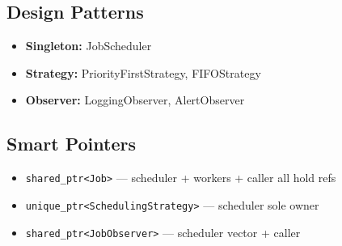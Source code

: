 \documentclass[11pt,a4paper]{article}
\begin{document}
\subsection{Design Patterns}
\begin{itemize}
    \item \textbf{Singleton:} JobScheduler
    \item \textbf{Strategy:} PriorityFirstStrategy, FIFOStrategy
    \item \textbf{Observer:} LoggingObserver, AlertObserver
\end{itemize}

\subsection{Smart Pointers}
\begin{itemize}
    \item \texttt{shared\_ptr<Job>} --- scheduler + workers + caller all hold refs
    \item \texttt{unique\_ptr<SchedulingStrategy>} --- scheduler sole owner
    \item \texttt{shared\_ptr<JobObserver>} --- scheduler vector + caller
\end{itemize}

\newpage
\end{document}
